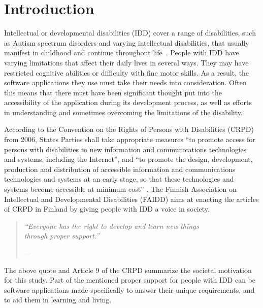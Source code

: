 \documentclass[utf8,english]{gradu3}
\begin{document}
\mainmatter

\chapter{Introduction}

Intellectual or developmental disabilities (IDD) cover a range of disabilities,
such as Autism spectrum disorders and varying intellectual disabilities,
that usually manifest in childhood and continue throughout life~\parencite[e.g.][]{dsm5}.
People with IDD have varying limitations that affect their daily lives in several ways.
They may have restricted cognitive abilities or difficulty with fine motor skills.
As a result, the software applications they use must take their needs into consideration.
Often this means that there must have been significant thought put into the accessibility
of the application during its development process, as well as efforts in understanding
and sometimes overcoming the limitations of the disability.

According to the Convention on the Rights of Persons with Disabilities (CRPD) from 2006,
States Parties shall take appropriate measures ``to promote access for persons with disabilities
to new information and communications technologies and systems, including the Internet'',
and ``to promote the design, development, production and distribution of accessible
information and communications technologies and systems at an early stage, so that these
technologies and systems become accessible at minimum cost'' \parencite[Article 9]{unitednations}.
The Finnish Association on Intellectual and Developmental Disabilities (FAIDD)
aims at enacting the articles of CRPD in Finland by giving people with IDD a voice in society.

\begin{quote}
  \centering
  \textit{``Everyone has the right to develop and learn new things \\through proper support.''}
  \begin{flushright}
    \footnotesize{---\textcite{kehitysvammaliittoID}}
  \end{flushright}
\end{quote}

The above quote and Article 9 of the CRPD summarize the societal motivation for this study.
Part of the mentioned proper support for people with IDD can be software applications
made specifically to answer their unique requirements, and to aid them in learning and living.
\end{document}
